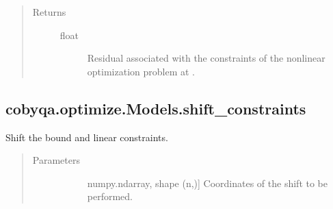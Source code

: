 \documentclass[letterpaper,10pt,english]{sphinxmanual}
\begin{document}
\begin{fulllineitems}
\begin{fulllineitems}
\begin{quote}
\begin{description}
\begin{description}
\end{description}

\item[{Returns}] \leavevmode\begin{description}
\item[{float}] \leavevmode
\sphinxAtStartPar
Residual associated with the constraints of the nonlinear
optimization problem at .

\end{description}

\end{description}\end{quote}

\end{fulllineitems}



\subsection{cobyqa.optimize.Models.shift\_constraints}
\label{\detokenize{refs/generated/cobyqa.optimize.Models.shift_constraints:cobyqa-optimize-models-shift-constraints}}\label{\detokenize{refs/generated/cobyqa.optimize.Models.shift_constraints::doc}}

\begin{fulllineitems}
\label{\detokenize{refs/generated/cobyqa.optimize.Models.shift_constraints:cobyqa.optimize.Models.shift_constraints}}
\sphinxAtStartPar
Shift the bound and linear constraints.
\begin{quote}\begin{description}
\item[{Parameters}] \leavevmode\begin{description}
\item[{}] \leavevmode{[}numpy.ndarray, shape (n,){]}
\sphinxAtStartPar
Coordinates of the shift to be performed.

\end{description}

\end{description}\end{quote}

\end{fulllineitems}




\end{fulllineitems}
\end{document}
